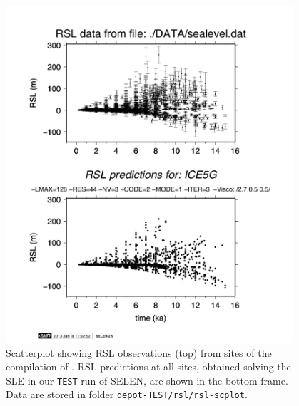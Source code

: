 \documentclass[11pt,fleqn,a4paper,titlepage]{article}
\newcommand\selens{\textsf{SELEN}}
\begin{document}
\begin{figure}[h]
\begin{center}
\vspace{-1.5cm}
\noindent\includegraphics[width=0.95\textwidth, angle=0]{./Figures/scatter-plot.png}
\caption[RSL scatterplot]{\small{Scatterplot showing RSL observations (top) from sites of the compilation of 
\citet{Tushingham_and_Peltier_1992,Tushingham_and_Peltier_1993}. 
RSL predictions at all sites, obtained solving the SLE in our \texttt{TEST} run of \selens, 
are shown in the bottom frame. Data are stored in folder \texttt{depot-TEST/rsl/rsl-scplot}.}}
\label{fig:rsl-scatterplot}
\end{center}
\end{figure}
\newpage
\end{document}
